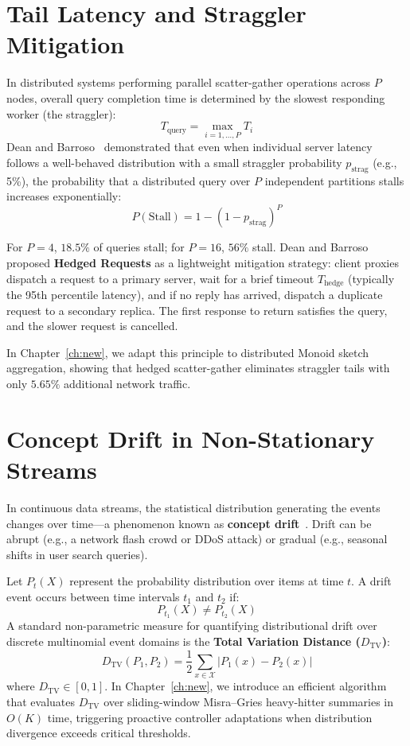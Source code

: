 \section{Tail Latency and Straggler Mitigation}

In distributed systems performing parallel scatter-gather operations across $P$ nodes, overall query completion time is determined by the slowest responding worker (the straggler):
\begin{equation}
    T_{\text{query}} = \max_{i=1, \dots, P} T_i
\end{equation}
Dean and Barroso~\cite{dean2013tail} demonstrated that even when individual server latency follows a well-behaved distribution with a small straggler probability $p_{\text{strag}}$ (e.g., 5\%), the probability that a distributed query over $P$ independent partitions stalls increases exponentially:
\begin{equation}
    P(\text{Stall}) = 1 - (1 - p_{\text{strag}})^P
\end{equation}

For $P = 4$, $18.5\%$ of queries stall; for $P = 16$, $56\%$ stall. Dean and Barroso proposed \textbf{Hedged Requests} as a lightweight mitigation strategy: client proxies dispatch a request to a primary server, wait for a brief timeout $T_{\text{hedge}}$ (typically the 95th percentile latency), and if no reply has arrived, dispatch a duplicate request to a secondary replica. The first response to return satisfies the query, and the slower request is cancelled.

In Chapter~\ref{ch:new}, we adapt this principle to distributed Monoid sketch aggregation, showing that hedged scatter-gather eliminates straggler tails with only $5.65\%$ additional network traffic.

\section{Concept Drift in Non-Stationary Streams}

In continuous data streams, the statistical distribution generating the events changes over time---a phenomenon known as \textbf{concept drift}~\cite{gama2014survey}. Drift can be abrupt (e.g., a network flash crowd or DDoS attack) or gradual (e.g., seasonal shifts in user search queries).

Let $P_t(X)$ represent the probability distribution over items at time $t$. A drift event occurs between time intervals $t_1$ and $t_2$ if:
\begin{equation}
    P_{t_1}(X) \ne P_{t_2}(X)
\end{equation}
A standard non-parametric measure for quantifying distributional drift over discrete multinomial event domains is the \textbf{Total Variation Distance ($D_{\text{TV}}$)}:
\begin{equation}
    D_{\text{TV}}(P_1, P_2) = \frac{1}{2} \sum_{x \in \mathcal{X}} |P_1(x) - P_2(x)|
\end{equation}
where $D_{\text{TV}} \in [0, 1]$. In Chapter~\ref{ch:new}, we introduce an efficient algorithm that evaluates $D_{\text{TV}}$ over sliding-window Misra--Gries heavy-hitter summaries in $O(K)$ time, triggering proactive controller adaptations when distribution divergence exceeds critical thresholds.
